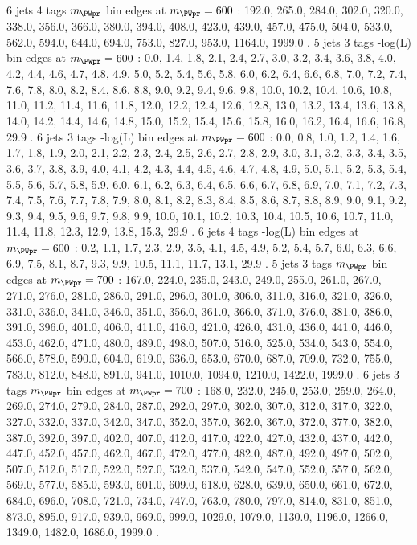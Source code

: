6 jets 4 \Pqb tags $m_{\PWpr}$ bin edges at $m_{\PWpr}=600$ \GeV:
192.0, 265.0, 284.0, 302.0, 320.0, 338.0, 356.0, 366.0, 380.0, 394.0, 408.0, 423.0, 439.0, 457.0, 475.0, 504.0, 533.0, 562.0, 594.0, 644.0, 694.0, 753.0, 827.0, 953.0, 1164.0, 1999.0 .
5 jets 3 \Pqb tags -log(L) bin edges at $m_{\PWpr}=600$ \GeV:
0.0, 1.4, 1.8, 2.1, 2.4, 2.7, 3.0, 3.2, 3.4, 3.6, 3.8, 4.0, 4.2, 4.4, 4.6, 4.7, 4.8, 4.9, 5.0, 5.2, 5.4, 5.6, 5.8, 6.0, 6.2, 6.4, 6.6, 6.8, 7.0, 7.2, 7.4, 7.6, 7.8, 8.0, 8.2, 8.4, 8.6, 8.8, 9.0, 9.2, 9.4, 9.6, 9.8, 10.0, 10.2, 10.4, 10.6, 10.8, 11.0, 11.2, 11.4, 11.6, 11.8, 12.0, 12.2, 12.4, 12.6, 12.8, 13.0, 13.2, 13.4, 13.6, 13.8, 14.0, 14.2, 14.4, 14.6, 14.8, 15.0, 15.2, 15.4, 15.6, 15.8, 16.0, 16.2, 16.4, 16.6, 16.8, 29.9 .
6 jets 3 \Pqb tags -log(L) bin edges at $m_{\PWpr}=600$ \GeV:
0.0, 0.8, 1.0, 1.2, 1.4, 1.6, 1.7, 1.8, 1.9, 2.0, 2.1, 2.2, 2.3, 2.4, 2.5, 2.6, 2.7, 2.8, 2.9, 3.0, 3.1, 3.2, 3.3, 3.4, 3.5, 3.6, 3.7, 3.8, 3.9, 4.0, 4.1, 4.2, 4.3, 4.4, 4.5, 4.6, 4.7, 4.8, 4.9, 5.0, 5.1, 5.2, 5.3, 5.4, 5.5, 5.6, 5.7, 5.8, 5.9, 6.0, 6.1, 6.2, 6.3, 6.4, 6.5, 6.6, 6.7, 6.8, 6.9, 7.0, 7.1, 7.2, 7.3, 7.4, 7.5, 7.6, 7.7, 7.8, 7.9, 8.0, 8.1, 8.2, 8.3, 8.4, 8.5, 8.6, 8.7, 8.8, 8.9, 9.0, 9.1, 9.2, 9.3, 9.4, 9.5, 9.6, 9.7, 9.8, 9.9, 10.0, 10.1, 10.2, 10.3, 10.4, 10.5, 10.6, 10.7, 11.0, 11.4, 11.8, 12.3, 12.9, 13.8, 15.3, 29.9 .
6 jets 4 \Pqb tags -log(L) bin edges at $m_{\PWpr}=600$ \GeV:
0.2, 1.1, 1.7, 2.3, 2.9, 3.5, 4.1, 4.5, 4.9, 5.2, 5.4, 5.7, 6.0, 6.3, 6.6, 6.9, 7.5, 8.1, 8.7, 9.3, 9.9, 10.5, 11.1, 11.7, 13.1, 29.9 .
5 jets 3 \Pqb tags $m_{\PWpr}$ bin edges at $m_{\PWpr}=700$ \GeV:
167.0, 224.0, 235.0, 243.0, 249.0, 255.0, 261.0, 267.0, 271.0, 276.0, 281.0, 286.0, 291.0, 296.0, 301.0, 306.0, 311.0, 316.0, 321.0, 326.0, 331.0, 336.0, 341.0, 346.0, 351.0, 356.0, 361.0, 366.0, 371.0, 376.0, 381.0, 386.0, 391.0, 396.0, 401.0, 406.0, 411.0, 416.0, 421.0, 426.0, 431.0, 436.0, 441.0, 446.0, 453.0, 462.0, 471.0, 480.0, 489.0, 498.0, 507.0, 516.0, 525.0, 534.0, 543.0, 554.0, 566.0, 578.0, 590.0, 604.0, 619.0, 636.0, 653.0, 670.0, 687.0, 709.0, 732.0, 755.0, 783.0, 812.0, 848.0, 891.0, 941.0, 1010.0, 1094.0, 1210.0, 1422.0, 1999.0 .
6 jets 3 \Pqb tags $m_{\PWpr}$ bin edges at $m_{\PWpr}=700$ \GeV:
168.0, 232.0, 245.0, 253.0, 259.0, 264.0, 269.0, 274.0, 279.0, 284.0, 287.0, 292.0, 297.0, 302.0, 307.0, 312.0, 317.0, 322.0, 327.0, 332.0, 337.0, 342.0, 347.0, 352.0, 357.0, 362.0, 367.0, 372.0, 377.0, 382.0, 387.0, 392.0, 397.0, 402.0, 407.0, 412.0, 417.0, 422.0, 427.0, 432.0, 437.0, 442.0, 447.0, 452.0, 457.0, 462.0, 467.0, 472.0, 477.0, 482.0, 487.0, 492.0, 497.0, 502.0, 507.0, 512.0, 517.0, 522.0, 527.0, 532.0, 537.0, 542.0, 547.0, 552.0, 557.0, 562.0, 569.0, 577.0, 585.0, 593.0, 601.0, 609.0, 618.0, 628.0, 639.0, 650.0, 661.0, 672.0, 684.0, 696.0, 708.0, 721.0, 734.0, 747.0, 763.0, 780.0, 797.0, 814.0, 831.0, 851.0, 873.0, 895.0, 917.0, 939.0, 969.0, 999.0, 1029.0, 1079.0, 1130.0, 1196.0, 1266.0, 1349.0, 1482.0, 1686.0, 1999.0 .
